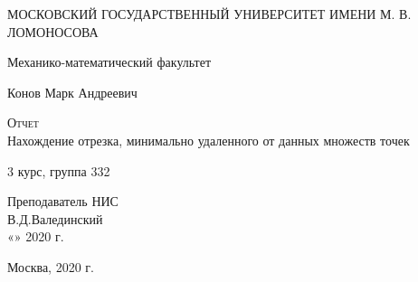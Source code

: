\begin{titlepage}
  \begin{center}
    \large
 
 	МОСКОВСКИЙ ГОСУДАРСТВЕННЫЙ УНИВЕРСИТЕТ ИМЕНИ М. В. ЛОМОНОСОВА 
    \vspace{2cm}
     
    Механико-математический факультет
    \vspace{0.25cm}
      
    Конов Марк Андреевич
    \vspace{0.25cm}
 
    \textsc{Отчет}\\[5mm]
     
    {\LARGE Нахождение отрезка, минимально удаленного от данных множеств точек}
  \bigskip
     
    3 курс, группа 332
\end{center}
\vfill
 
\newlength{\ML}
\hfill\begin{minipage}{0.3\textwidth}
  Преподаватель НИС\\
  В.Д.Валединский\\
  «\underline{\hspace{0.7cm}}» \underline{\hspace{2cm}} 2020 г.
\end{minipage}%
\vfill
\bigskip
 
\begin{center}
  Москва, 2020 г.
\end{center}
\end{titlepage}
\newpage
